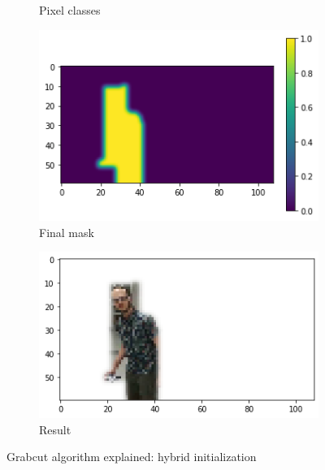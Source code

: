 \begin{figure}[!h]
\begin{center}
\begin{subfigure}[h]{0.24\textwidth}
			\caption[]{Pixel classes}
			\label{fig:grabcut-hybrid-explain-2}
		\end{subfigure}
		\hfill
		\begin{subfigure}[h]{0.24\textwidth}
			\centering
			\includegraphics[width=1\textwidth]{"contents/images/04-2grabcut-3hybrid-steps-3"}
			\caption[]{Final mask}
			\label{fig:grabcut-hybrid-explain-3}
		\end{subfigure}
		\hfill
		\begin{subfigure}[h]{0.24\textwidth}
			\centering
			\includegraphics[width=1\textwidth]{"contents/images/04-2grabcut-3hybrid-steps-4"}
			\caption[]{Result}
			\label{fig:grabcut-hybrid-explain-4}
		\end{subfigure}
		\hfill
	\end{center}
	\vspace{-0.5cm}
	\caption[Grabcut algorithm explained: hybrid initialization]{Grabcut algorithm explained: hybrid initialization}
	\label{fig:grabcut-hybrid-explain}
\end{figure}

